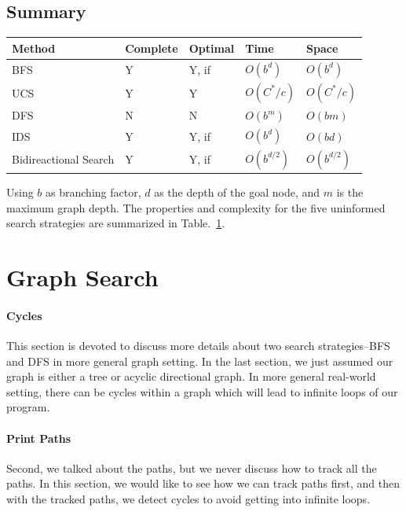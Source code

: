 \documentclass[../main.tex]{subfiles}
\begin{document}
\subsection{Summary}
\begin{table}[!ht]
\begin{small}
\centering
\noindent{}
 \noindent \begin{tabular}{|p{}|p{}|p{}|p{}|p{}| }
  \hline
Method & Complete & Optimal & Time & Space   \\ \hline
BFS  & Y& Y, if & $O(b^d)$ & $O(b^d)$ \\\hline
UCS  &Y & Y & $O(C^{*}/c)$ & $O(C^{*}/c)$\\ \hline
DFS & N & N & $O(b^m)$ & $O(bm)$\\ \hline
IDS & Y & Y, if & $O(b^d)$ & $O(bd)$\\ \hline
Bidireactional Search & Y& Y, if& $O(b^{d/2})$ & $O(b^{d/2})$\\ \hline
\end{tabular}
  \label{tab:performance of searching strategy}
  \end{small}
\end{table}
Using $b$ as branching factor, $d$ as the depth of the goal node, and $m$  is the maximum graph depth. The properties and complexity for the five uninformed search strategies are summarized in Table.~\ref{tab:performance of searching strategy}.

 


 
\section{Graph Search}
\paragraph{Cycles}
This section is devoted to discuss more details about two search strategies--BFS and DFS in more general graph setting. In the last section, we just assumed our graph is either a tree or acyclic directional graph. In more general real-world setting, there can be cycles within a graph which will lead to infinite loops of our program. 
\paragraph{Print Paths} Second, we talked about the paths, but we never discuss how to track all the paths. In this section, we would like to see how we can track paths first, and then with the tracked paths, we detect cycles to avoid getting into infinite loops. 
\end{document}
